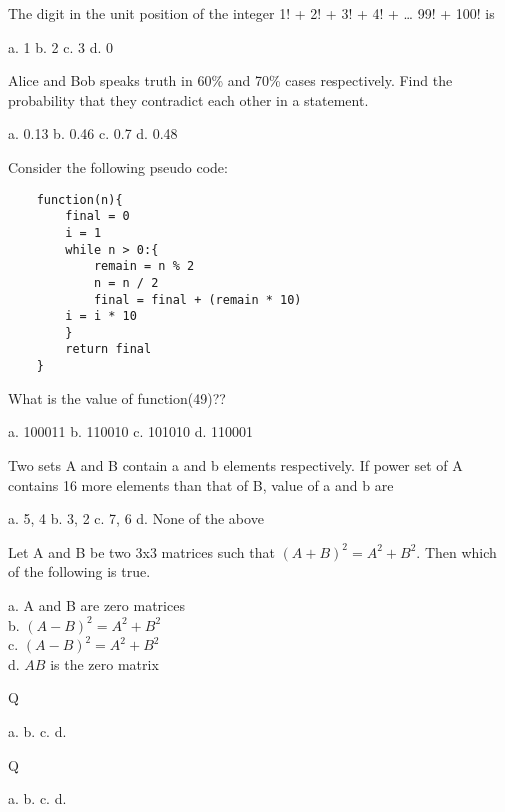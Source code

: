 \documentclass[a4paper, addpoints]{exam}
\begin{document}
\begin{questions}
	\question The digit in the unit position of the integer 1! + 2! + 3! + 4! + … 99! + 100! is \\
	\begin{oneparcheckboxes}
		\choice a. 1
		\choice b. 2
		\choice c. 3
		\choice d. 0
	\end{oneparcheckboxes}
	\question Alice and Bob speaks truth in 60\% and 70\% cases respectively. Find the probability that they contradict each other in a statement.\\
		\begin{oneparcheckboxes}
		\choice a. 0.13
		\choice b. 0.46
		\choice c. 0.7
		\choice d. 0.48
	\end{oneparcheckboxes}
	\question Consider the following pseudo code:
	\begin{verbatim}
	function(n){
		final = 0
		i = 1
		while n > 0:{
			remain = n % 2
			n = n / 2
			final = final + (remain * 10)
		i = i * 10
		}
		return final
	}
	\end{verbatim}
	What is the value of function(49)??\\
	\begin{oneparcheckboxes}
		\choice a. 100011
		\choice b. 110010
		\choice c. 101010
		\choice d. 110001
	\end{oneparcheckboxes}
	
	\question Two sets A and B contain a and b elements respectively. If power set of A contains 16 more elements than that of B, value of a and b are

	\begin{oneparcheckboxes}
		\choice a. 5, 4
		\choice b. 3, 2
		\choice c. 7, 6
		\choice d. None of the above
	\end{oneparcheckboxes}
	\question Let A and B be two 3x3 matrices such that $(A+B)^2 = A^2 + B^2.$ Then which of the following is true.\\
	\begin{oneparcheckboxes}
		\choice a. A and B are zero matrices\\
		\choice b. $(A - B)^2 = A^2 + B^2$\\
		\choice c. $(A - B)^2 = A^2 + B^2$\\
		\choice d. $AB$ is the zero matrix\\
	\end{oneparcheckboxes}
	\question Q
	\begin{oneparcheckboxes}
		\choice a.
		\choice b.
		\choice c.
		\choice d.
	\end{oneparcheckboxes}
	\question Q
	\begin{oneparcheckboxes}
		\choice a.
		\choice b.
		\choice c.
		\choice d.
	\end{oneparcheckboxes}
\end{questions}
\end{document}
